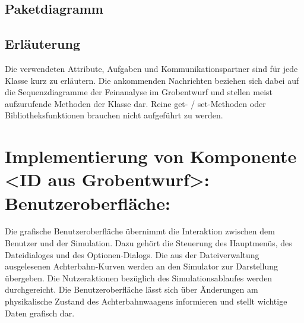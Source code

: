 \subsection{Paketdiagramm}
\subsection{Erläuterung}

Die verwendeten Attribute, Aufgaben und Kommunikationspartner sind für jede
Klasse kurz zu erläutern. Die ankommenden Nachrichten beziehen sich dabei auf
die Sequenzdiagramme der Feinanalyse im Grobentwurf und stellen meist
aufzurufende Methoden der Klasse dar.  Reine get- / set-Methoden oder
Bibliotheksfunktionen brauchen nicht aufgeführt zu werden.

\section{Implementierung von Komponente
         <ID aus Grobentwurf>: Benutzeroberfläche:}

Die grafische Benutzeroberfläche übernimmt die Interaktion zwischen dem Benutzer und
der Simulation. Dazu gehört die Steuerung des Hauptmenüs, des Dateidialoges und
des Optionen-Dialogs. Die aus der Dateiverwaltung ausgelesenen Achterbahn-Kurven 
werden an den Simulator zur Darstellung übergeben. Die Nutzeraktionen bezüglich des
Simulationsablaufes werden durchgereicht. Die Benutzeroberfläche lässt sich über
Änderungen am physikalische Zustand des Achterbahnwaagens informieren und stellt
wichtige Daten grafisch dar.

